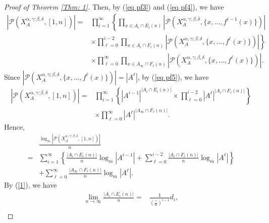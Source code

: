 \documentclass{amsart}
\theoremstyle{definition}
\numberwithin{equation}{section}%
\begin{document}
\begin{proof}[Proof of Theorem \ref{Thm: 1}]
Then, by (\ref{eq pf3}) and (\ref{eq pf4}), we have
\begin{equation}\label{eq pf5}
  \begin{aligned}  \left|\mathcal{P}\left(X_A^{\alpha,\gamma;\beta,\delta}, [1, n]\right)\right|
  =&\prod_{i=1}^\infty \left\{\prod_{x\in A_i\cap E_i(n)}\left|\mathcal{P}(X_A^{\alpha,\gamma;\beta,\delta} , \{x, ..., f^{i-1}(x)\})\right |\right.\\
  &\left.\times \prod_{\ell=0}^{i-2}\prod_{x\in A_i\cap F_\ell(n)}\left|\mathcal{P}\left(X_A^{\alpha,\gamma;\beta,\delta}, \{x, ..., f^{\ell}(x)\}\right)\right| \right\}\\
  &\times\prod_{\ell=0}^{\infty}\prod_{x\in A_\infty\cap F_\ell(n)}\left|\mathcal{P}\left(X_A^{\alpha,\gamma;\beta,\delta}, \{x, ..., f^{\ell}(x)\}\right)\right|.
  \end{aligned}
\end{equation}
Since $\left|\mathcal{P}\left(X_A^{\alpha,\gamma;\beta,\delta}, \{x, ..., f^{\ell}(x)\}\right)\right|=\left|A^\ell \right|$, by (\ref{eq pf5}), we have
  \begin{align*}  \left|\mathcal{P}\left(X_A^{\alpha,\gamma;\beta,\delta}, [1, n]\right)\right|
  =&\prod_{i=1}^\infty \left\{ \left|A^{i-1}\right|^{\left| A_i\cap E_i(n)\right|}\times \prod_{\ell=0}^{i-2} \left|A^\ell\right|^{\left| A_i\cap F_\ell(n)\right|} \right\}\\
&\times\prod_{\ell=0}^{\infty}\left|A^{\ell}\right|^{\left|A_\infty\cap F_\ell(n)\right|}.
  \end{align*}
Hence,
\begin{equation}\label{eq pf6}
    \begin{aligned}
&\frac{\log_m\left|\mathcal{P}\left(X_A^{\alpha,\gamma;\beta,\delta}, [1, n]\right)\right|}{n}\\ =&\sum_{i=1}^\infty \left\{\frac{\left| A_i\cap E_i(n)\right|}{n} \log_m\left|A^{i-1}\right|+ \sum_{\ell=0}^{i-2} \frac{\left| A_i\cap F_\ell(n)\right|}{n}\log_m\left|A^\ell\right| \right\}\\
  &+\sum_{\ell=0}^{\infty}\frac{\left|A_\infty\cap F_\ell(n)\right|}{n}\log_m\left|A^{\ell}\right|.
  \end{aligned}
\end{equation}
By (\ref{1}), we have 
\begin{equation}\label{eq pf7}
    \begin{aligned}
        \lim_{n\to\infty}\frac{\left| A_i\cap E_i(n)\right|}{n} =&\frac{1}{(\frac{\gamma}{\alpha})^{i-1}}d_i,\\

\end{aligned}
\end{equation}
\end{proof}
\end{document}
